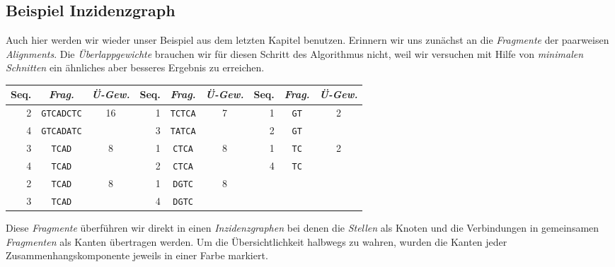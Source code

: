 \subsection{Beispiel Inzidenzgraph}

Auch hier werden wir wieder unser Beispiel aus dem letzten Kapitel benutzen. Erinnern wir uns zunächst an die \emph{Fragmente} der paarweisen \emph{Alignments}. Die \emph{Überlappgewichte} brauchen wir für diesen Schritt des Algorithmus nicht, weil wir versuchen mit Hilfe von \emph{minimalen Schnitten} ein ähnliches aber besseres Ergebnis zu erreichen.

\begin{tabular}{r|c|c||r|c|c||r|c|c}
	Seq. & \emph{Frag.} & \emph{Ü-Gew.} & Seq. & \emph{Frag.} & \emph{Ü-Gew.} & Seq. & \emph{Frag.} & \emph{Ü-Gew.}\\
	\hline
	2 & \texttt{GTCADCTC} & \multirow{2}{*}{16} & 1 & \texttt{TCTCA} & \multirow{2}{*}{7} & 1 & \texttt{GT} &\multirow{2}{*}{2} \\
	4 & \texttt{GTCADATC} &                     & 3 & \texttt{TATCA} &                     & 2 & \texttt{GT} & \\
	3 & \texttt{TCAD} & \multirow{2}{*}{8} & 1 & \texttt{CTCA} & \multirow{2}{*}{8} & 1 & \texttt{TC} & \multirow{2}{*}{2} \\
	4 & \texttt{TCAD} &                     & 2 & \texttt{CTCA} &                          & 4 & \texttt{TC} & \\
	2 & \texttt{TCAD} & \multirow{2}{*}{8} & 1 & \texttt{DGTC} & \multirow{2}{*}{8} &    &   & \\
	3 & \texttt{TCAD} &                     & 4 & \texttt{DGTC} &                     &    &   & \\
\end{tabular}

Diese \emph{Fragmente} überführen wir direkt in einen \emph{Inzidenzgraphen} bei denen die \emph{Stellen} als Knoten und die Verbindungen in gemeinsamen \emph{Fragmenten} als Kanten übertragen werden. Um die Übersichtlichkeit halbwegs zu wahren, wurden die Kanten jeder Zusammenhangskomponente jeweils in einer Farbe markiert.


